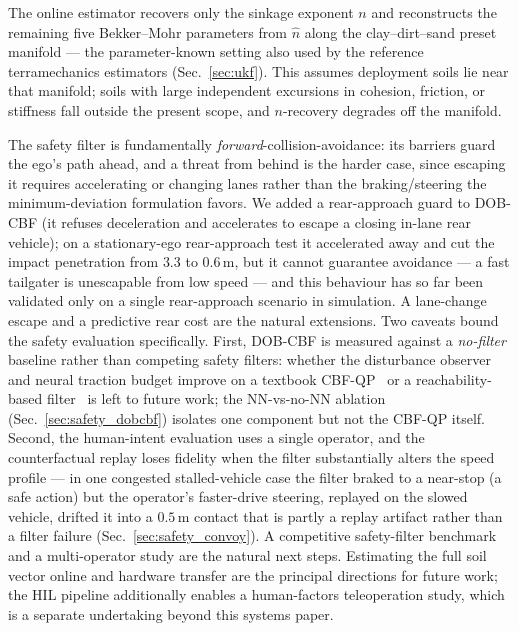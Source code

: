 \documentclass[conference,letterpaper,10pt]{IEEEtran}
\begin{document}
The online estimator recovers only the sinkage exponent $n$ and
reconstructs the remaining five Bekker--Mohr parameters from $\hat n$
along the clay--dirt--sand preset manifold --- the parameter-known
setting also used by the reference terramechanics estimators
(Sec.~\ref{sec:ukf}). This assumes deployment soils lie near that
manifold; soils with large independent excursions in cohesion, friction,
or stiffness fall outside the present scope, and $n$-recovery degrades
off the manifold.

The safety filter is fundamentally \emph{forward}-collision-avoidance: its
barriers guard the ego's path ahead, and a threat from behind is the harder
case, since escaping it requires accelerating or changing lanes rather than
the braking/steering the minimum-deviation formulation favors. We added a
rear-approach guard to DOB-CBF (it refuses deceleration and accelerates to
escape a closing in-lane rear vehicle); on a stationary-ego rear-approach test
it accelerated away and cut the impact penetration from $3.3$ to $0.6\,$m, but
it cannot guarantee avoidance --- a fast tailgater is unescapable from low
speed --- and this behaviour has so far been validated only on a single
rear-approach scenario in simulation. A lane-change escape and a predictive
rear cost are the natural extensions.
Two caveats bound the safety evaluation specifically. First, DOB-CBF is
measured against a \emph{no-filter} baseline rather than competing safety
filters: whether the disturbance observer and neural traction budget improve
on a textbook CBF-QP~\cite{Ames19} or a reachability-based
filter~\cite{Bansal17} is left to future work; the NN-vs-no-NN ablation
(Sec.~\ref{sec:safety_dobcbf}) isolates one component but not the CBF-QP itself.
Second, the human-intent evaluation uses a single operator, and the
counterfactual replay loses fidelity when the filter substantially alters the
speed profile --- in one congested stalled-vehicle case the filter braked to a
near-stop (a safe action) but the operator's faster-drive steering, replayed
on the slowed vehicle, drifted it into a $0.5\,$m contact that is partly a
replay artifact rather than a filter failure (Sec.~\ref{sec:safety_convoy}). A
competitive safety-filter benchmark and a multi-operator study are the natural
next steps.
Estimating the full soil vector online and hardware transfer are the
principal directions for future work; the HIL pipeline additionally enables
a human-factors teleoperation study, which is a separate undertaking beyond
this systems paper.

\end{document}
